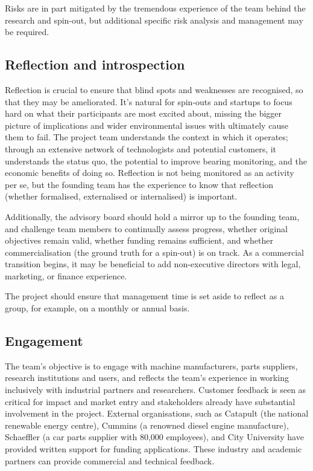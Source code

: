 \documentclass[runningheads]{llncs}
\begin{document}
    Risks are in part mitigated by the tremendous experience of the team behind the research and spin-out, but additional specific risk analysis and management may be required.
\subsection{Reflection and introspection}
    Reflection is crucial to ensure that blind spots and weaknesses are recognised, so that they may be ameliorated. It's natural for spin-outs and startups to focus hard on what their participants are most excited about, missing the bigger picture of implications and wider environmental issues with ultimately cause them to fail. The project team understands the context in which it operates; through an extensive network of technologists and potential customers, it understands the status quo, the potential to improve bearing monitoring, and the economic benefits of doing so. Reflection is not being monitored as an activity per se, but the founding team has the experience to know that reflection (whether formalised, externalised or internalised) is important. 
    
    Additionally, the advisory board should hold a mirror up to the founding team, and challenge team members to continually assess progress, whether original objectives remain valid, whether funding remains sufficient, and whether commercialisation (the ground truth for a spin-out) is on track. As a commercial transition begins, it may be beneficial to add non-executive directors with legal, marketing, or finance experience. 

    The project should ensure that management time is set aside to reflect as a group, for example, on a monthly or annual basis.        
\subsection{Engagement}
    The team's objective is to engage with machine manufacturers, parts suppliers, research institutions and users, and reflects the team's experience in working inclusively with industrial partners and researchers. Customer feedback is seen as critical for impact and market entry and stakeholders already have substantial involvement in the project. External organisations, such as Catapult (the national renewable energy centre), Cummins (a renowned diesel engine manufacture), Schaeffler (a car parts supplier with 80,000 employees), and City University have provided written support for funding applications. These industry and academic partners can provide commercial and technical feedback.
\end{document}
